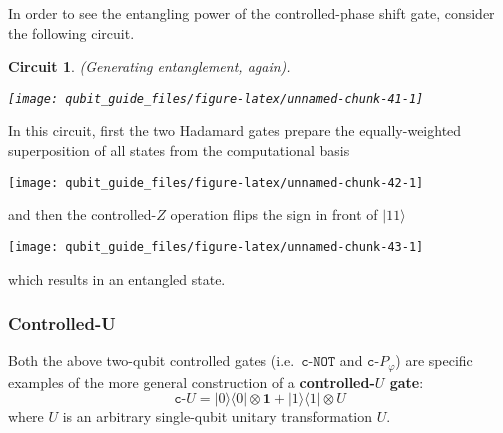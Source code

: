 \documentclass[fleqn]{article}
\newtheorem*{circuit}{Circuit}
\begin{document}
In order to see the entangling power of the controlled-phase shift gate, consider the following circuit.

\begin{circuit}

(Generating entanglement, again).

\begin{center}\texttt{[image: qubit\_guide\_files/figure-latex/unnamed-chunk-41-1]} \end{center}

\end{circuit}

In this circuit, first the two Hadamard gates prepare the equally-weighted superposition of all states from the computational basis

\begin{center}\texttt{[image: qubit\_guide\_files/figure-latex/unnamed-chunk-42-1]} \end{center}

and then the controlled-\(Z\) operation flips the sign in front of \(|11\rangle\)

\begin{center}\texttt{[image: qubit\_guide\_files/figure-latex/unnamed-chunk-43-1]} \end{center}

which results in an entangled state.

\hypertarget{controlled-u}{%
\subsubsection{Controlled-U}\label{controlled-u}}

Both the above two-qubit controlled gates (i.e.~\(\texttt{c-NOT}\) and \(\texttt{c-}P_\varphi\)) are specific examples of the more general construction of a \textbf{controlled-\(U\) gate}:
\[
  \texttt{c-}U
  = |0\rangle\langle 0|\otimes\mathbf{1}+ |1\rangle\langle 1|\otimes U
\]
where \(U\) is an arbitrary single-qubit unitary transformation \(U\).
\end{document}
